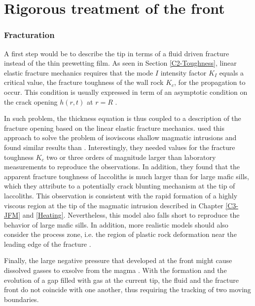 \section{Rigorous treatment of the front}
\label{sec:rigor-treatm-front}

\subsubsection*{Fracturation}
\label{sec:fracturation}

A first step  would be to describe  the tip in terms of  a fluid driven
fracture  instead of  the thin  prewetting  film. As  seen in  Section
\ref{C2-Toughness},  linear elastic  fracture mechanics  requires that
the  mode $I$  intensity factor  $K_I$  equals a  critical value,  the
fracture toughness  of the wall  rock $K_{c}$, for the  propagation to
occur. This  condition is usually  expressed in term of  an asymptotic
condition    on    the    crack     opening    $h(r,t)$    at    $r=R$
\citep{Savitski:2002gy,Bunger:2005em,Bunger:2007vs,Detournay:2014fk}.

In  such  problem,  the  thickness  equation  is  thus  coupled  to  a
description  of  the fracture  opening  based  on the  linear  elastic
fracture mechanics. \citet{Bunger:2011cb} used  this approach to solve
the  problem  of  isoviscous  shallow magmatic  intrusions  and  found
similar  results  than  \citet{Michaut:2011kg}.   Interestingly,  they
needed values for the fracture toughness  $K_c$ two or three orders of
magnitude  larger  than  laboratory   measurements  to  reproduce  the
observations.   In addition,  they  found that  the apparent  fracture
toughness of  laccoliths is  much larger than  for large  mafic sills,
which they attribute to a  potentially crack blunting mechanism at the
tip  of laccoliths.   This observation  is consistent  with the  rapid
formation  of a  highly  viscous region  at the  tip  of the  magmatic
intrusion      described     in      Chapter     \ref{C3-JFM}      and
\ref{Heating}. Nevertheless, this model  also falls short to reproduce
the behavior of large mafic sills.  In addition, more realistic models
should also consider the process zone, i.e. the region of plastic rock
deformation    near    the    leading    edge    of    the    fracture
\citep{Bunger:2008cl}.

Finally, the large negative pressure that developed at the front might
cause    dissolved    gasses    to     exsolve    from    the    magma
\citep{Lister:2013ia}. With the  formation and the evolution  of a gap
filled with gas  at the current tip, the fluid  and the fracture front
do not coincide  with one another, thus requiring the  tracking of two
moving boundaries.

